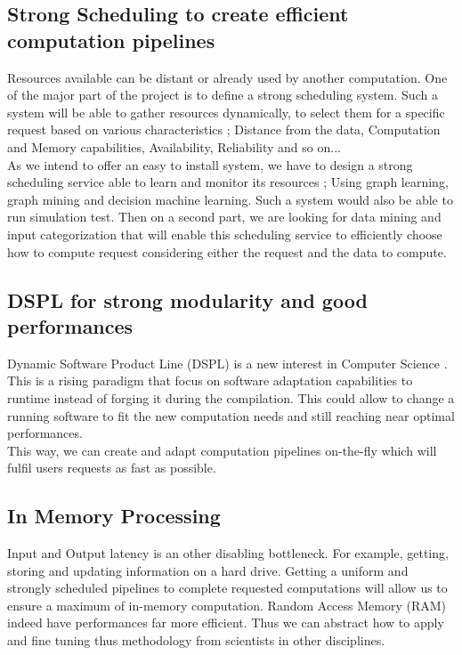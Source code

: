 		\subsection{Strong Scheduling to create efficient computation pipelines}
			Resources available can be distant or already used by another computation.
			One of the major part of the project is to define a strong scheduling system.
			Such a system will be able to gather resources dynamically, to select them for a specific request based on various characteristics ; Distance from the data, Computation and Memory capabilities, Availability, Reliability and so on...
			\\
			As we intend to offer an easy to install system, we have to design a strong scheduling service able to learn and monitor its resources ; Using graph learning, graph mining and decision machine learning.
			Such a system would also be able to run simulation test.
			Then on a second part, we are looking for data mining and input categorization that will enable this scheduling service to efficiently choose how to compute request considering either the request and the data to compute.

		\subsection{DSPL for strong modularity and good performances}
			Dynamic Software Product Line (DSPL) is a new interest in Computer Science \cite{DSPL}.
			This is a rising paradigm that focus on software adaptation capabilities to runtime instead of forging it during the compilation.
			This could allow to change a running software to fit the new computation needs and still reaching near optimal performances.
			\\
			This way, we can create and adapt computation pipelines on-the-fly which will fulfil users requests as fast as possible.
		
		\subsection{In Memory Processing}
			Input and Output latency is an other disabling bottleneck. For example, getting, storing and updating information on a hard drive.
			Getting a uniform and strongly scheduled pipelines to complete requested computations will allow us to ensure a maximum of in-memory computation.
			Random Access Memory (RAM) indeed have performances far more efficient.
			Thus we can abstract how to apply and fine tuning thus methodology from scientists in other disciplines.
			

